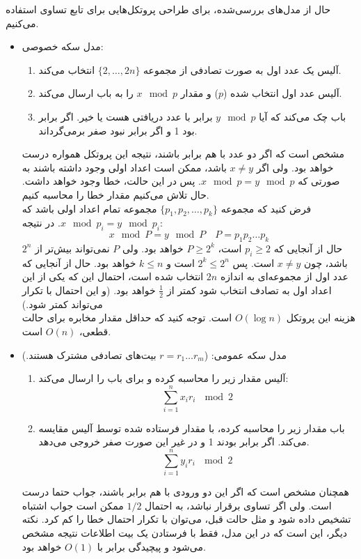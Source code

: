 \begin{example}
حال از مدل‌های بررسی‌شده، برای طراحی پروتکل‌هایی برای تابع تساوی استفاده می‌کنیم. 
\begin{itemize}
\item مدل سکه خصوصی: 
\begin{enumerate}
\item آلیس یک عدد اول به صورت تصادفی از مجموعه $\{2, \dots, 2n\}$ انتخاب می‌کند.
\item آلیس عدد اول انتخاب شده ($p$) و مقدار $x \mod p$ را به باب ارسال می‌کند.
\item باب چک می‌کند که آیا $y \mod p$ برابر با عدد دریافتی هست یا خیر. اگر برابر بود 1 و اگر برابر نبود صفر برمی‌گرداند.
\end{enumerate}
مشخص است که اگر دو عدد با هم برابر باشند، نتیجه این پروتکل همواره درست خواهد بود. ولی اگر $x \neq y$ باشد، ممکن است اعداد اولی وجود داشته باشند به صورتی که $x \mod p = y \mod p$. پس در این حالت، خطا وجود خواهد داشت. حال تلاش می‌کنیم مقدار خطا را محاسبه کنیم.\\
فرض کنید که مجموعه $\{p_1, p_2, \dots, p_k\}$ مجموعه تمام اعداد اولی باشد که $x \mod p_i = y \mod p_i$. در نتیجه:
\begin{equation*}
x \mod P = y \mod P \quad P = p_1p_2\dots p_k
\end{equation*}
حال از آنجایی که $p_i \geq 2$ است، $P \geq 2^k$ خواهد بود. ولی $P$ نمی‌تواند بیش‌تر از $2^n$ باشد، چون $x \neq y$ است. پس $2^k \leq 2^n$ است و $k \leq n$ خواهد بود. حال از آنجایی که عدد اول از مجموعه‌ای به اندازه $2n$ انتخاب شده است، احتمال این که یکی از این اعداد اول به تصادف انتخاب شود کمتر از $\frac{1}{2}$ خواهد بود. (و این احتمال با تکرار می‌تواند کمتر شود.)\\
هزینه این پروتکل $O(\log n)$ است. توجه کنید که حداقل مقدار مخابره برای حالت قطعی، $O(n)$ است.
\item مدل سکه عمومی: ($r = r_1\dots r_m$ بیت‌های تصادفی مشترک‌ هستند.)
\begin{enumerate}
\item آلیس مقدار زیر را محاسبه کرده و برای باب را ارسال می‌کند:
\[\sum^n_{i=1} x_ir_i\ \mod 2\]
\item باب مقدار زیر را محاسبه کرده، با مقدار فرستاده شده توسط آلیس مقایسه می‌کند. اگر برابر بودند 1 و در غیر این صورت صفر خروجی می‌دهد.
\[\sum^n_{i=1} y_ir_i\ \mod 2\]
\end{enumerate}
همچنان مشخص است که اگر این دو ورودی با هم برابر باشند، جواب حتما درست است. ولی اگر تساوی برقرار نباشد، به احتمال $1/2$ ممکن است جواب اشتباه تشخیص داده شود و مثل حالت قبل، می‌توان با تکرار احتمال خطا را کم کرد. نکته دیگر، این است که در این مدل، فقط با فرستادن یک بیت اطلاعات نتیجه مشخص می‌شود و پیچیدگی برابر با $O(1)$ خواهد بود.
\end{itemize}
\end{example}
